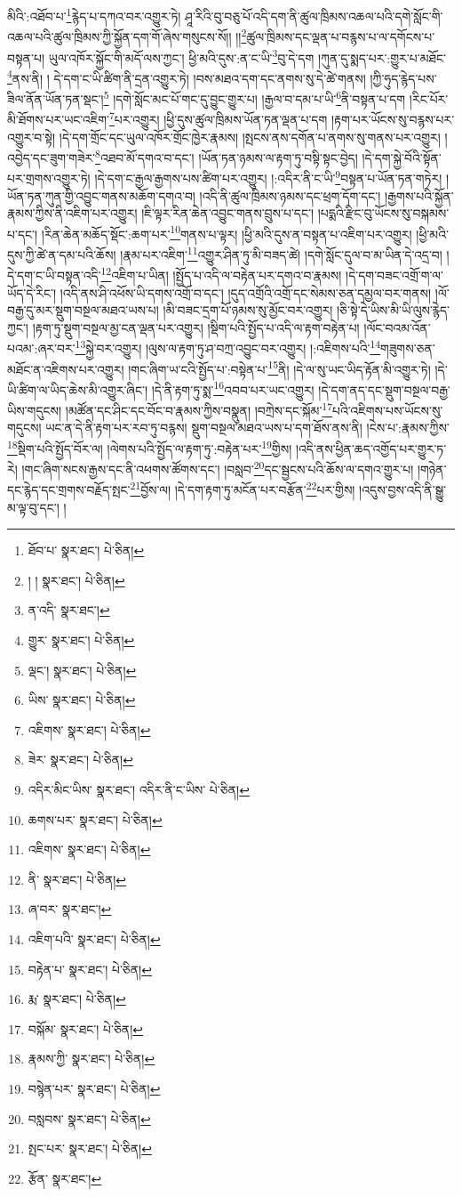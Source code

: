 མིའི་:འཐོབ་པ་\footnote{ཐོབ་པ་  སྣར་ཐང་།  པེ་ཅིན། }རྙེད་པ་དཀའ་བར་འགྱུར་ཏེ། ཤཱ་རིའི་བུ་བཅུ་པོ་འདི་དག་ནི་ཚུལ་ཁྲིམས་འཆལ་པའི་དགེ་སློང་གི་འཆལ་པའི་ཚུལ་ཁྲིམས་ཀྱི་སྐྱོན་དག་གོ་ཞེས་གསུངས་སོ།། །།\footnote{། །  སྣར་ཐང་།  པེ་ཅིན། }ཚུལ་ཁྲིམས་དང་ལྡན་པ་བརྙས་པ་ལ་དགོངས་པ་བསྟན་པ། ཡུལ་འཁོར་སྐྱོང་གི་མདོ་ལས་ཀྱང་། ཕྱི་མའི་དུས་:ན་ང་ཡི་\footnote{ན་འདི་  སྣར་ཐང་། }བུ་དེ་དག །ཀུན་དུ་སྨད་པར་:གྱུར་པ་མཐོང་\footnote{གྱུར་  སྣར་ཐང་།  པེ་ཅིན། }ནས་ནི། །
དེ་དག་ང་ཡི་ཚིག་ནི་དྲན་འགྱུར་ཏེ། །བས་མཐའ་དག་དང་ནགས་སུ་དེ་ཚེ་གནས། །ཀྱི་ཧུད་རྙེད་པས་ཟིལ་ནོན་ཡོན་ཏན་སྡང་།\footnote{ལྡང་།  སྣར་ཐང་།  པེ་ཅིན། } །དགེ་སློང་མང་པོ་གང་དུ་བྱུང་གྱུར་པ། །རྒྱལ་བ་དམ་པ་ཡི་\footnote{ཡིས་  སྣར་ཐང་།  པེ་ཅིན། }ནི་བསྟན་པ་དག །རིང་པོར་མི་ཐོགས་པར་ཡང་འཇིག་\footnote{འཇིགས་  སྣར་ཐང་།  པེ་ཅིན། }པར་འགྱུར། །ཕྱི་དུས་ཚུལ་ཁྲིམས་ཡོན་ཏན་ལྡན་པ་དག །རྟག་པར་ཡོངས་སུ་བརྙས་པར་འགྱུར་བ་སྟེ། །དེ་དག་གྲོང་དང་ཡུལ་འཁོར་གྲོང་ཁྱེར་རྣམས། །སྤངས་ནས་དགོན་པ་ནགས་སུ་གནས་པར་འགྱུར། །འབྱེད་དང་ཟུག་གཟེར་\footnote{ཟེར་  སྣར་ཐང་།  པེ་ཅིན། }འཐབ་མོ་དགའ་བ་དང་། །ཡོན་ཏན་ཉམས་ལ་རྟག་ཏུ་བསྟི་སྟང་བྱེད། །དེ་དག་སྐྱེ་བོའི་སྟོན་པར་གྲགས་འགྱུར་ཏེ། །དེ་དག་ང་རྒྱལ་རྒྱགས་པས་ཚིག་པར་འགྱུར། །:འདིར་ནི་ང་ཡི་\footnote{འདིར་མིང་ཡིས་  སྣར་ཐང་། འདིར་ནི་ང་ཡིས་  པེ་ཅིན། }བསྟན་པ་ཡོན་ཏན་གཏེར། །ཡོན་ཏན་ཀུན་གྱི་འབྱུང་གནས་མཆོག་དགའ་བ། །འདི་ནི་ཚུལ་ཁྲིམས་ཉམས་དང་ཕྲག་དོག་དང་། །རྒྱགས་པའི་སྐྱོན་རྣམས་ཀྱིས་ནི་འཇིག་པར་འགྱུར། །ཇི་ལྟར་རིན་ཆེན་འབྱུང་གནས་བྲུས་པ་དང་། །པདྨའི་རྫིང་བུ་ཡོངས་སུ་བསྐམས་པ་དང་། །རིན་ཆེན་མཆོད་སྡོང་:ཆག་པར་\footnote{ཆགས་པར་  སྣར་ཐང་།  པེ་ཅིན། }གནས་པ་ལྟར། །ཕྱི་མའི་དུས་ན་བསྟན་པ་འཇིག་པར་འགྱུར། །ཕྱི་མའི་དུས་ཀྱི་ཚེ་ན་དམ་པའི་ཆོས། །རྣམ་པར་འཇིག་\footnote{འཇིགས་  སྣར་ཐང་།  པེ་ཅིན། }འགྱུར་ཤིན་ཏུ་མི་བཟད་ཚེ། །དགེ་སློང་དུལ་བ་མ་ཡིན་དེ་འདྲ་བ། །དེ་དག་ང་ཡི་བསྟན་འདི་\footnote{ནི་  སྣར་ཐང་།  པེ་ཅིན། }འཇིག་པ་ཡིན། །སྤྱོད་པ་འདི་ལ་བརྟེན་པར་དགའ་བ་རྣམས། །དེ་དག་བཟང་འགྲོ་ག་ལ་ཡོད་དེ་རིང་། །འདི་ནས་ཤི་འཕོས་ཡི་དགས་འགྲོ་བ་དང་། །དུད་འགྲོའི་འགྲོ་དང་སེམས་ཅན་དམྱལ་བར་གནས། །ལོ་བརྒྱ་དུ་མར་སྡུག་བསྔལ་མཐའ་ཡས་པ། །མི་བཟང་དྲག་པོ་ཉམས་སུ་མྱོང་བར་འགྱུར། །ཅི་སྟེ་དེ་ཡིས་མི་ཡི་ལུས་རྙེད་ཀྱང་། །རྟག་ཏུ་སྡུག་བསྔལ་མྱ་ངན་ལྡན་པར་འགྱུར། །སྡིག་པའི་སྤྱོད་པ་འདི་ལ་རྟག་བརྟེན་པ། །ལོང་བའམ་འོན་པའམ་:ཞར་བར་\footnote{ཞ་བར་  སྣར་ཐང་། }སྐྱེ་བར་འགྱུར། །ལུས་ལ་རྟག་ཏུ་ཤ་བཀྲ་འབྱུང་བར་འགྱུར། །:འཇིགས་པའི་\footnote{འཇིག་པའི་  སྣར་ཐང་།  པེ་ཅིན། }གཟུགས་ཅན་མཐོང་ན་འཇིགས་པར་འགྱུར། །གང་ཞིག་ཡ་ངའི་སྤྱོད་པ་:བསྟེན་པ་\footnote{བརྟེན་པ་  སྣར་ཐང་།  པེ་ཅིན། }ནི། །དེ་ལ་སུ་ཡང་ཡིད་རྟོན་མི་འགྱུར་ཏེ། །དེ་ཡི་ཚིག་ལ་ཡིད་ཆེས་མི་འགྱུར་ཞིང་། །དེ་ནི་རྟག་ཏུ་སྨ་\footnote{རྨ་  སྣར་ཐང་།  པེ་ཅིན། }འབབ་པར་ཡང་འགྱུར། །དེ་དག་ནད་དང་སྡུག་བསྔལ་བརྒྱ་ཡིས་གདུངས། །མཚོན་དང་ཤིང་དང་བོང་བ་རྣམས་ཀྱིས་བསྣུན། །བཀྲེས་དང་སྐོམ་\footnote{བསྐོམ་  སྣར་ཐང་།  པེ་ཅིན། }པའི་འཇིགས་པས་ཡོངས་སུ་གདུངས། ཡང་ན་དེ་ནི་རྟག་པར་རབ་ཏུ་བརྙས། སྡུག་བསྔལ་མཐའ་ཡས་པ་དག་ཐོས་ནས་ནི། །ངེས་པ་:རྣམས་ཀྱིས་\footnote{རྣམས་ཀྱི་  སྣར་ཐང་།  པེ་ཅིན། }སྡིག་པའི་སྤྱོད་བོར་ལ། །ལེགས་པའི་སྤྱོད་ལ་རྟག་ཏུ་:བརྟེན་པར་\footnote{བསྙེན་པར་  སྣར་ཐང་།  པེ་ཅིན། }གྱིས། །འདི་ནས་ཕྱིན་ཆད་འགྱོད་པར་གྱུར་ཏ་རེ། །གང་ཞིག་སངས་རྒྱས་དང་ནི་འཕགས་ཚོགས་དང་། །བསླབ་\footnote{བསླབས་  སྣར་ཐང་།  པེ་ཅིན། }དང་སྦྱངས་པའི་ཆོས་ལ་དགའ་གྱུར་པ། །གཉེན་དང་རྙེད་དང་གྲགས་བརྗོད་སྤང་\footnote{སྤང་པར་  སྣར་ཐང་།  པེ་ཅིན། }བྱོས་ལ། །དེ་དག་རྟག་ཏུ་མངོན་པར་བརྩོན་\footnote{རྩོན་  སྣར་ཐང་། }པར་གྱིས། །འདུས་བྱས་འདི་ནི་སྒྱུ་མ་ལྟ་བུ་དང་། །
